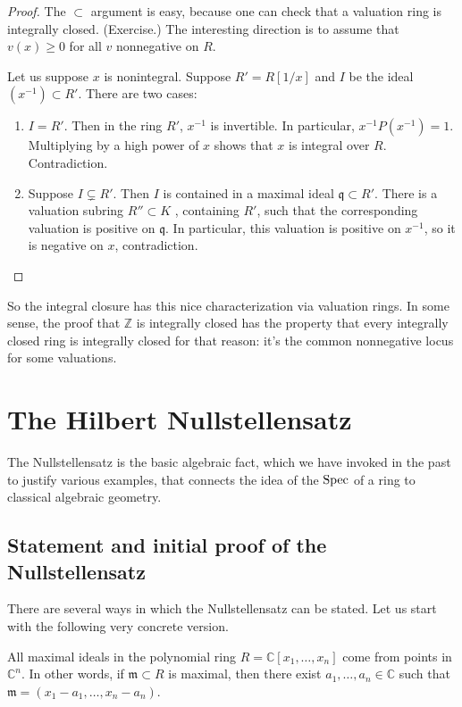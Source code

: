 \begin{proof} 
The $\subset$ argument is easy, because one can check that a valuation ring is
integrally closed. (Exercise.)
The interesting direction is to assume that $v(x) \geq 0$ for all $v$ nonnegative
on $R$. 

Let us suppose $x$ is nonintegral. Suppose $R' = R[1/x]$ and $I$ be the ideal
$(x^{-1}) \subset R'$. There are two cases:
\begin{enumerate}
\item $I = R'$. Then in the ring $R'$, $x^{-1} $ is invertible. In particular,
$x^{-1}P(x^{-1}) = 1$. Multiplying by a high power of $x$ shows that $x$ is
integral over $R$.  Contradiction.
\item  Suppose $I \subsetneq R'$. Then $I$ is contained in a maximal ideal
$\mathfrak{q} \subset R'$.  There is a valuation subring $R'' \subset K$ ,
containing $R'$, such that the corresponding valuation is positive on
$\mathfrak{q}$.  In particular, this valuation is positive on $x^{-1}$, so it is
negative on $x$, contradiction. 
\end{enumerate}
\end{proof} 

So the integral closure has this nice characterization via valuation rings. In
some sense, the proof that $\mathbb{Z}$ is integrally closed has the property
that every integrally closed ring is integrally closed for that reason: it's the
common nonnegative locus for some valuations.  

\section{The Hilbert Nullstellensatz}

The Nullstellensatz is the basic algebraic fact, which we have invoked in the
past to justify various examples, that connects the idea of
the $\mathrm{Spec}$ of a ring to classical algebraic geometry. 

\subsection{Statement and initial proof of the Nullstellensatz}

There are several ways in which the Nullstellensatz can be stated. Let us
start with the following very concrete version. 

\begin{theorem} \label{nullstellensatzoverC}
All maximal ideals in the polynomial ring $R=\mathbb{C}[x_1, \dots, x_n]$ come
from points in $\mathbb{C}^n$. In other words, if $\mathfrak{m} \subset R$ is
maximal, then there exist $a_1, \dots, a_n \in \mathbb{C}$ such that 
$\mathfrak{m} = (x_1 - a_1, \dots, x_n - a_n)$.
\end{theorem} 


